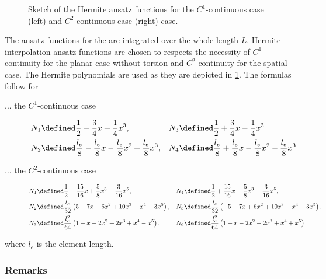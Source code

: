 \begin{figure}
  \begin{center}
    \caption[Hermite ansatz functions]{Sketch of the Hermite ansatz functions for the $C^1$-continuous case (left) and $C^2$-continuous case (right) case.}
    \label{fig:PIC_141113_HermiteFunction}
  \end{center}
\end{figure}

The ansatz functions for the \FE are integrated over the whole length $L$.
Hermite interpolation ansatz functions are chosen to respects the necessity of $C^1$-continuity for the planar case without torsion and $C^2$-continuity for the spatial case.
The Hermite polynomials are used as they are depicted in \cref{fig:PIC_141113_HermiteFunction}.
The formulas follow for

\begin{description}
  \item[... the $C^1$-continuous case]
  \begin{align*}
    N_1 &\defined \frac{1}{2} - \frac{3}{4} x + \frac{1}{4} x^3, &
    N_3 &\defined \frac{1}{2} + \frac{3}{4} x - \frac{1}{4} x^3 \\
    N_2 &\defined \frac{l_e}{8} - \frac{l_e}{8} x - \frac{l_e}{8} x^2 + \frac{l_e}{8} x^3,&
    N_4 &\defined \frac{l_e}{8} + \frac{l_e}{8} x - \frac{l_e}{8} x^2 - \frac{l_e}{8} x^3
  \end{align*}
  \item[... the $C^2$-continuous case]
  \begin{align*}
    N_1 &\defined \frac{1}{2} - \frac{15}{16} x + \frac{5}{8} x^3 - \frac{3}{16} x^5,&
    N_4 &\defined \frac{1}{2} + \frac{15}{16} x - \frac{5}{8} x^3 + \frac{3}{16} x^5,\\
    N_2 &\defined \frac{l_e}{32} \left(5 - 7 x - 6 x^2 + 10 x^3 + x^4 - 3 x^5\right),&
    N_5 &\defined \frac{l_e}{32} \left(-5 - 7 x + 6 x^2 + 10 x^3 - x^4 - 3 x^5\right),\\
    N_3 &\defined \frac{l_e^2}{64} \left(1 - x - 2 x^2 + 2 x^3 + x^4 - x^5\right),&
    N_6 &\defined \frac{l_e^2}{64} \left(1 + x - 2 x^2 - 2 x^3 + x^4 + x^5\right)
  \end{align*}
\end{description}

where $l_e$ is the element length.

\subsubsection{Remarks}

